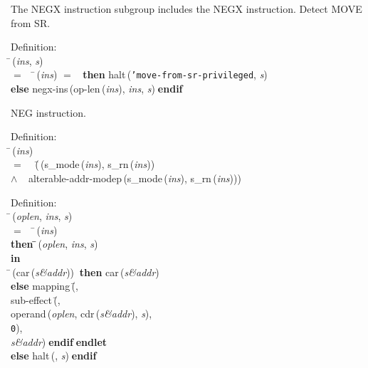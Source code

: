  The NEGX instruction subgroup includes the NEGX instruction.
 Detect MOVE from SR.
\begin{tabbing}{\sc Definition}: \\  
\=\,({\it{ins\/}}, {\it{s\/}}) \\ 
$=$$\;\;\;\;$\=\,({\it{ins\/}}) $=$ {}$\;\;${\bf then }{\rm{halt}}\,({\tt{'}}{\tt{move-from-sr-privileged}}, {\it{s\/}}) \\ 
{\bf else }{\rm{negx-ins}}\,({\rm{op-len}}\,({\it{ins\/}}), {\it{ins\/}}, {\it{s\/}})$\;${\bf  endif}\-\-
\end{tabbing}

 NEG instruction.
\begin{tabbing}{\sc Definition}: \\  
\=\,({\it{ins\/}}) \\ 
$=$$\;\;\;\;$(\=\,({\rm{s\_mode}}\,({\it{ins\/}}), {\rm{s\_rn}}\,({\it{ins\/}})) \\ 
$\wedge$$\;\;\;\;${\rm{alterable-addr-modep}}\,({\rm{s\_mode}}\,({\it{ins\/}}), {\rm{s\_rn}}\,({\it{ins\/}})))\-\-
\end{tabbing}

\begin{tabbing}{\sc Definition}: \\  
\=\,({\it{oplen\/}}, {\it{ins\/}}, {\it{s\/}}) \\ 
$=$$\;\;\;\;$\=\,({\it{ins\/}}) \\ 
{\bf then }\=\=\,({\it{oplen\/}}, {\it{ins\/}}, {\it{s\/}})\- \\ 
{\bf in} \\ 
\=\,({\rm{car}}\,({\it{s\&addr\/}}))$\;\;${\bf then }{\rm{car}}\,({\it{s\&addr\/}}) \\ 
{\bf else }{\rm{mapping}}\,(\=, \\ 
{\rm{sub-effect}}\,(\=, \\ 
{\rm{operand}}\,({\it{oplen\/}}, {\rm{cdr}}\,({\it{s\&addr\/}}), {\it{s\/}}), \\ 
{\tt{0}})\-, \\ 
{\it{s\&addr\/}})\-$\;${\bf  endif}\-$\;${\bf  endlet}\- \\ 
{\bf else }{\rm{halt}}\,({}, {\it{s\/}})$\;${\bf  endif}\-\-
\end{tabbing}

